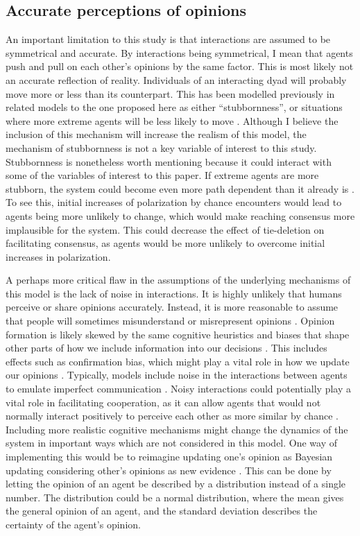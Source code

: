 \documentclass{article}
\begin{document}
\subsection{Accurate perceptions of opinions}

An important limitation to this study is that interactions are assumed to be symmetrical and accurate. 
By interactions being symmetrical, I mean that agents push and pull on each other’s opinions by the same factor. 
This is most likely not an accurate reflection of reality. 
Individuals of an interacting dyad will probably move more or less than its counterpart. 
This has been modelled previously in related models to the one proposed here as either “stubbornness”, or situations where more extreme agents will be less likely to move \cite{flache_models_2017,ghaderi_opinion_2014,yildiz_binary_2013}. 
Although I believe the inclusion of this mechanism will increase the realism of this model, the mechanism of stubbornness is not a key variable of interest to this study. 
Stubbornness is nonetheless worth mentioning because it could interact with some of the variables of interest to this paper. 
If extreme agents are more stubborn, the system could become even more path dependent than it already is \cite{turner_paths_2018}. 
To see this, initial increases of polarization by chance encounters would lead to agents being more unlikely to change, which would make reaching consensus more implausible for the system. This could decrease the effect of tie-deletion on facilitating consensus, as agents would be more unlikely to overcome initial increases in polarization. 

A perhaps more critical flaw in the assumptions of the underlying mechanisms of this model is the lack of noise in interactions. 
It is highly unlikely that humans perceive or share opinions accurately. 
Instead, it is more reasonable to assume that people will sometimes misunderstand or misrepresent opinions \cite{jussim_influence_1989}. 
Opinion formation is likely skewed by the same cognitive heuristics and biases that shape other parts of how we include information into our decisions \cite{arceneaux_cognitive_2012}. This includes effects such as confirmation bias, which might play a vital role in how we update our opinions \cite{allahverdyan_opinion_2014}. 
Typically, models include noise in the interactions between agents to emulate imperfect communication \cite{sirbu2017opinion,su_noise_2017}. Noisy interactions could potentially play a vital role in facilitating cooperation, as it can allow agents that would not normally interact positively to perceive each other as more similar by chance \cite{allahverdyan_opinion_2014,su_noise_2017}. Including more realistic cognitive mechanisms might change the dynamics of the system in important ways which are not considered in this model. 
One way of implementing this would be to reimagine updating one’s opinion as Bayesian updating considering other’s opinions as new evidence \cite{allahverdyan_opinion_2014}. This can be done by letting the opinion of an agent be described by a distribution instead of a single number. The distribution could be a normal distribution, where the mean gives the general opinion of an agent, and the standard deviation describes the certainty of the agent’s opinion.  
\end{document}
